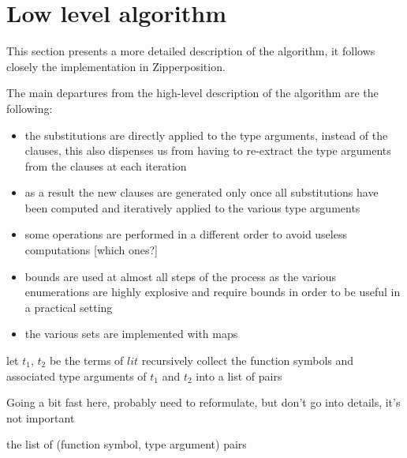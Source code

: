 \documentclass[]{ceurart}
\begin{document}
\section{Low level algorithm}

This section presents a more detailed description of the algorithm, it follows closely the implementation in Zipperposition.

The main departures from the high-level description of the algorithm are the following:
\begin{itemize}
   \item the substitutions are directly applied to the type arguments, instead of the clauses, this also dispenses us from having to re-extract the type arguments from the clauses at each iteration
   \item as a result the new clauses are generated only once all substitutions have been computed and iteratively applied to the various type arguments
   \item some operations are performed in a different order to avoid useless computations [which ones?]
   \item bounds are used at almost all steps of the process as the various enumerations are highly explosive and require bounds in order to be useful in a practical setting
   \item the various sets are implemented with maps
\end{itemize}

\begin{algorithm}[th]
\begin{algorithmic}[1]

   \State let \(t_1\), \(t_2\) be the terms of \(lit\)
   \State recursively collect the function symbols and associated type arguments of \(t_1\) and \(t_2\) into a list of pairs

   \State \Comment Going a bit fast here, probably need to reformulate, but don't go into details, it's not important

   \State \Return the list of (function symbol, type argument) pairs

\EndFunction
\end{algorithmic}
\end{algorithm}
\end{document}

